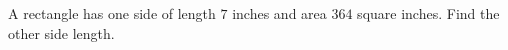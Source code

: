 A rectangle has one side of length $ 7 $ inches and area $ 364 $ square inches. Find the other side length.
